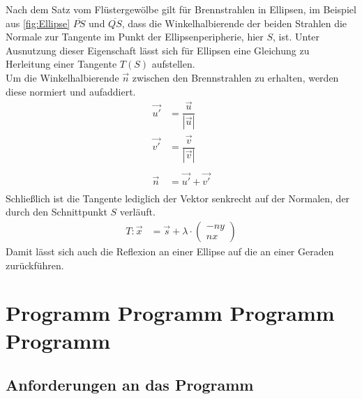 \documentclass[reducespace,stylepage,semiarbeit]{spezidoc}
\begin{document}
Nach dem Satz vom Flüstergewölbe gilt für Brennstrahlen in Ellipsen, im Beispiel aus \ref{fig:Ellipse} $\overline{PS}$ und $\overline{QS}$, dass die Winkelhalbierende der beiden Strahlen die Normale zur Tangente im Punkt der Ellipsenperipherie, hier $S$, ist. %
Unter Ausnutzung dieser Eigenschaft lässt sich für Ellipsen eine Gleichung zu Herleitung einer Tangente $T(S)$ aufstellen.\\
Um die Winkelhalbierende $\vec{n}$ zwischen den Brennstrahlen zu erhalten, werden diese normiert und aufaddiert.
\begin{equation*}
\begin{split}
\vec{u'} & = \dfrac{\vec{u}}{|\vec{u}|} \\
\vec{v'}  &= \dfrac{\vec{v}}{|\vec{v}|} \\ \\
\vec{n} & = \vec{u'} + \vec{v'} \\ 
\end{split}
\end{equation*}
Schließlich ist die Tangente lediglich der Vektor senkrecht auf der Normalen, der durch den Schnittpunkt $S$ verläuft.
\begin{equation*}
\begin{split}
T: \vec{x} & = \vec{s} + \lambda \cdot \begin{pmatrix} -ny \\ nx \end{pmatrix}
\end{split}
\end{equation*}
Damit lässt sich auch die Reflexion an einer Ellipse auf die an einer Geraden zurückführen.


\newpage

\section{Programm Programm Programm Programm } %

\subsection{Anforderungen an das Programm}
\end{document}
